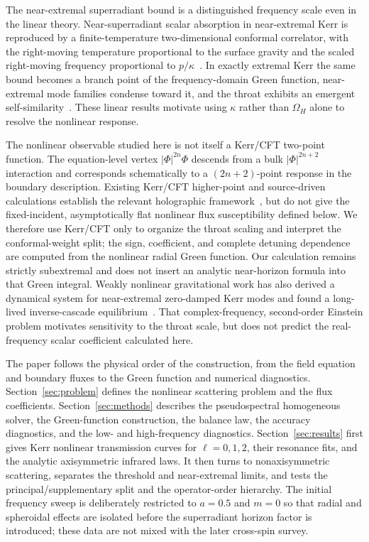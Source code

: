 \documentclass[aps,prd,twocolumn,10pt,nofootinbib,superscriptaddress,floatfix]{revtex4-2}
\begin{document}
The near-extremal superradiant bound is a distinguished frequency scale even
in the linear theory.  Near-superradiant scalar absorption in near-extremal
Kerr is reproduced by a finite-temperature two-dimensional conformal
correlator, with the right-moving temperature proportional to the surface
gravity and the scaled right-moving frequency proportional to
$p/\kappa$~\cite{BredbergKerrCFT2010,HartmanKerrCFT2010,
CastroHiddenCFT2010}.  In exactly extremal Kerr the same bound becomes a branch
point of the frequency-domain Green function, near-extremal mode families
condense toward it, and the throat exhibits an emergent
self-similarity~\cite{CasalsGrallaZimmerman2016,CasalsZimmerman2019,
CasalsLongoMicchi2019,GrallaZimmerman2018}.  These linear results motivate
using $\kappa$ rather than $\Omega_H$ alone to resolve the nonlinear response.

The nonlinear observable studied here is not itself a Kerr/CFT two-point
function.  The equation-level vertex $|\Phi|^{2n}\Phi$ descends from a bulk
$|\Phi|^{2n+2}$ interaction and corresponds schematically to a
$(2n+2)$-point response in the boundary description.  Existing Kerr/CFT
higher-point and source-driven calculations establish the relevant
holographic framework~\cite{BeckerKerrCFT2011,PorfyriadisKerrCFT2014}, but do
not give the fixed-incident, asymptotically flat nonlinear flux susceptibility
defined below.  We therefore use Kerr/CFT only to organize the throat scaling
and interpret the conformal-weight split; the sign, coefficient, and complete
detuning dependence are computed from the nonlinear radial Green function.
Our calculation remains strictly subextremal and does not insert an analytic
near-horizon formula into that Green integral.  Weakly nonlinear
gravitational work has also derived a dynamical system for near-extremal
zero-damped Kerr modes and found a long-lived inverse-cascade
equilibrium~\cite{GreenEtAl2023,Iuliano2025}.  That complex-frequency,
second-order Einstein problem motivates sensitivity to the throat scale, but
does not predict the real-frequency scalar coefficient calculated here.

The paper follows the physical order of the construction, from the field
equation and boundary fluxes to the Green function and numerical diagnostics.
Section~\ref{sec:problem} defines the nonlinear scattering problem and the flux
coefficients.  Section~\ref{sec:methods} describes the pseudospectral
homogeneous solver, the Green-function construction, the balance law, the
accuracy diagnostics, and the low- and high-frequency diagnostics.
Section~\ref{sec:results} first gives Kerr nonlinear transmission curves for
$\ell=0,1,2$, their resonance fits, and the analytic axisymmetric infrared
laws.  It then turns to nonaxisymmetric scattering, separates the threshold
and near-extremal limits, and tests the principal/supplementary split and the
operator-order hierarchy.  The initial frequency sweep is deliberately
restricted to $a=0.5$ and $m=0$ so that radial and spheroidal effects are
isolated before the superradiant horizon factor is introduced; these data are
not mixed with the later cross-spin survey.
\end{document}
